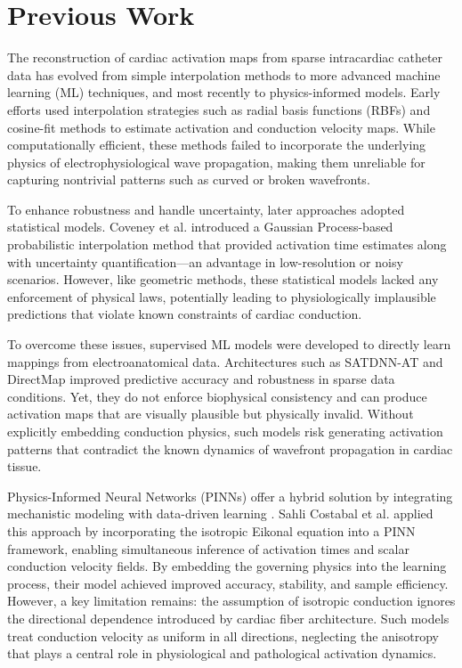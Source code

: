 \section{Previous Work}

The reconstruction of cardiac activation maps from sparse intracardiac catheter data has evolved from simple interpolation methods to more advanced machine learning (ML) techniques, and most recently to physics-informed models. Early efforts used interpolation strategies such as radial basis functions (RBFs) and cosine-fit methods \cite{Mase2010} to estimate activation and conduction velocity maps. While computationally efficient, these methods failed to incorporate the underlying physics of electrophysiological wave propagation, making them unreliable for capturing nontrivial patterns such as curved or broken wavefronts.

To enhance robustness and handle uncertainty, later approaches adopted statistical models. Coveney et al. \cite{coveney2020} introduced a Gaussian Process-based probabilistic interpolation method that provided activation time estimates along with uncertainty quantification—an advantage in low-resolution or noisy scenarios. However, like geometric methods, these statistical models lacked any enforcement of physical laws, potentially leading to physiologically implausible predictions that violate known constraints of cardiac conduction.

To overcome these issues, supervised ML models were developed to directly learn mappings from electroanatomical data. Architectures such as SATDNN-AT and DirectMap \cite{Karoui2021} improved predictive accuracy and robustness in sparse data conditions. Yet, they do not enforce biophysical consistency and can produce activation maps that are visually plausible but physically invalid. Without explicitly embedding conduction physics, such models risk generating activation patterns that contradict the known dynamics of wavefront propagation in cardiac tissue.

Physics-Informed Neural Networks (PINNs) offer a hybrid solution by integrating mechanistic modeling with data-driven learning \cite{raissi2019}. Sahli Costabal et al. \cite{SahliCostabal2020} applied this approach by incorporating the isotropic Eikonal equation into a PINN framework, enabling simultaneous inference of activation times and scalar conduction velocity fields. By embedding the governing physics into the learning process, their model achieved improved accuracy, stability, and sample efficiency. However, a key limitation remains: the assumption of isotropic conduction ignores the directional dependence introduced by cardiac fiber architecture. Such models treat conduction velocity as uniform in all directions, neglecting the anisotropy that plays a central role in physiological and pathological activation dynamics.

